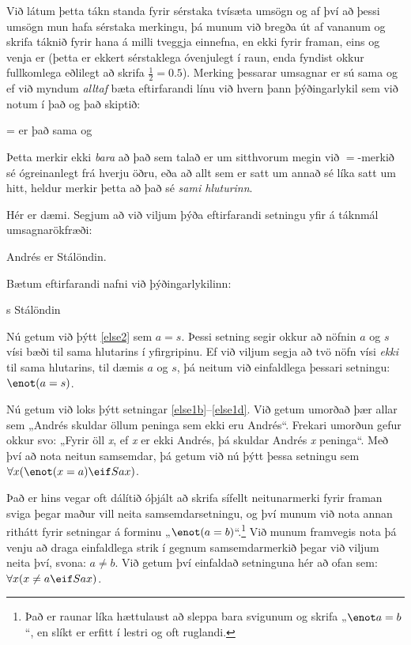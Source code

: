 Við látum þetta tákn standa fyrir sérstaka tvísæta umsögn og af því að þessi umsögn mun hafa sérstaka merkingu, þá munum við bregða út af vananum og skrifa táknið fyrir hana á milli tveggja einnefna, en ekki fyrir framan, eins og venja er (þetta er ekkert sérstaklega óvenjulegt í raun, enda fyndist okkur fullkomlega eðlilegt að skrifa $\frac{1}{2} = 0.5$). Merking þessarar umsagnar er sú sama og ef við myndum \emph{alltaf} bæta eftirfarandi línu við hvern þann þýðingarlykil sem við notum í það og það skiptið:
	\begin{ekey}
		\item[=]  er það sama og 
	\end{ekey}
Þetta merkir ekki \emph{bara} að það sem talað er um sitthvorum megin við $=$-merkið sé ógreinanlegt frá hverju öðru, eða að allt sem er satt um annað sé líka satt um hitt, heldur merkir þetta að það sé \emph{sami hluturinn}.

Hér er dæmi. Segjum að við viljum þýða eftirfarandi setningu yfir á táknmál umsagnarökfræði:
\begin{earg}
\item[\ex{else2}] Andrés er Stálöndin.
\end{earg}
Bætum eftirfarandi nafni við þýðingarlykilinn:
	\begin{ekey}
		\item[s] Stálöndin
	\end{ekey}
Nú getum við þýtt \ref{else2} sem $a = s$. Þessi setning segir okkur að nöfnin $a$ og $s$ vísi bæði til sama hlutarins í yfirgripinu. Ef við viljum segja að tvö nöfn vísi \emph{ekki} til sama hlutarins, til dæmis $a$ og $s$, þá neitum við einfaldlega þessari setningu: $\enot (a = s)$.

Nú getum við loks þýtt setningar \ref{else1b}--\ref{else1d}. Við getum umorðað þær allar sem „Andrés skuldar öllum peninga sem ekki eru Andrés“. Frekari umorðun gefur okkur svo: „Fyrir öll \emph{x}, ef \emph{x} er ekki Andrés, þá skuldar Andrés \emph{x} peninga“. Með því að nota neitun samsemdar, þá getum við nú þýtt þessa setningu sem $\forall x (\enot(x = a) \eif Sax)$.

Það er hins vegar oft dálítið óþjált að skrifa sífellt neitunarmerki fyrir framan sviga þegar maður vill neita samsemdarsetningu, og því munum við nota annan rithátt fyrir setningar á forminu „$\enot(a = b)$“.\footnote{Það er raunar líka hættulaust að sleppa bara svigunum og skrifa „$\enot a = b$“, en slíkt er erfitt í lestri og oft ruglandi.} Við munum framvegis nota þá venju að draga einfaldlega strik í gegnum samsemdarmerkið þegar við viljum neita því, svona: $a \neq b$. Við getum því einfaldað setninguna hér að ofan sem: $\forall x (x \neq a \eif Sax)$.

